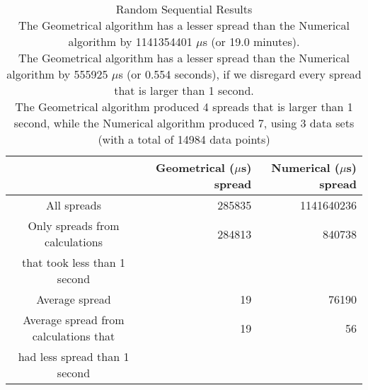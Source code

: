 \begin{table}[bth!]\footnotesize
 \begin{tabular}[3]{c|r|r}
 & Geometrical ($\mu$s) spread & Numerical ($\mu$s) spread\\
\hline
All spreads & 285835 & 1141640236 \\ 
\hline 
Only spreads from calculations & 284813 & 840738 \\ 
that took less than 1 second & & \\ 
\hline
Average spread & 19 & 76190 \\
\hline
Average spread from calculations that & 19 & 56 \\ 
had less spread than 1 second & & \\ 
\end{tabular}\\ \\
\caption{Random Sequential Results\\
The Geometrical algorithm has a lesser spread than the Numerical algorithm by 1141354401 $\mu$s (or 19.0 minutes).\\
The Geometrical algorithm has a lesser spread than the Numerical algorithm by 555925 $\mu$s (or 0.554 seconds), if we disregard every spread that is larger than 1 second.\\
The Geometrical algorithm produced 4 spreads that is larger than 1 second, while the Numerical algorithm produced 7, using 3 data sets (with a total of 14984 data points)\\
}\label{sequential-random_spreadtable}\end{table}